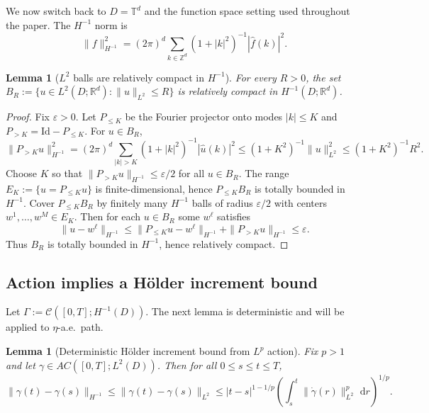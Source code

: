 \documentclass{article}
\numberwithin{equation}{section}
\theoremstyle{plain}
\newtheorem{lemma}[theorem]{Lemma}
\theoremstyle{definition}
\theoremstyle{remark}
\newcommand{\R}{\mathbb{R}}
\newcommand{\T}{\mathbb{T}}
\newcommand{\Ccal}{\mathcal{C}}
\newcommand{\Id}{\mathrm{Id}}
\newcommand{\dd}{\,\mathrm{d}}
\newcommand{\Z}{\mathbb{Z}}
\begin{document}
We now switch back to $D=\T^d$ and the function space setting used throughout the paper.
The $H^{-1}$ norm is
\[
\|f\|_{H^{-1}}^2=(2\pi)^d\sum_{k\in\Z^d}(1+|k|^2)^{-1}|\widehat f(k)|^2.
\]

\begin{lemma}[$L^2$ balls are relatively compact in $H^{-1}$]
\label{lem:L2ball-compact-Hminus1}
For every $R>0$, the set $B_R:=\{u\in L^2(D;\R^d):\|u\|_{L^2}\le R\}$ is relatively compact in $H^{-1}(D;\R^d)$.
\end{lemma}

\begin{proof}
Fix $\varepsilon>0$. Let $P_{\le K}$ be the Fourier projector onto modes $|k|\le K$ and $P_{>K}=\Id-P_{\le K}$.
For $u\in B_R$,
\[
\|P_{>K}u\|_{H^{-1}}^2
=(2\pi)^d\sum_{|k|>K}(1+|k|^2)^{-1}|\widehat u(k)|^2
\le (1+K^2)^{-1}\|u\|_{L^2}^2
\le (1+K^2)^{-1}R^2.
\]
Choose $K$ so that $\|P_{>K}u\|_{H^{-1}}\le \varepsilon/2$ for all $u\in B_R$.
The range $E_K:=\{u=P_{\le K}u\}$ is finite-dimensional, hence $P_{\le K}B_R$ is totally bounded in $H^{-1}$.
Cover $P_{\le K}B_R$ by finitely many $H^{-1}$ balls of radius $\varepsilon/2$ with centers $w^1,\dots,w^M\in E_K$.
Then for each $u\in B_R$ some $w^\ell$ satisfies
\[
\|u-w^\ell\|_{H^{-1}}\le \|P_{\le K}u-w^\ell\|_{H^{-1}}+\|P_{>K}u\|_{H^{-1}}\le \varepsilon.
\]
Thus $B_R$ is totally bounded in $H^{-1}$, hence relatively compact.
\end{proof}

\subsection{Action implies a H\"older increment bound}

Let $\Gamma:=\Ccal([0,T];H^{-1}(D))$. The next lemma is deterministic and will be applied to $\eta$-a.e.\ path.

\begin{lemma}[Deterministic H\"older increment bound from $L^p$ action]\label{lem:det-holder-from-action}
Fix $p>1$ and let $\gamma\in AC([0,T];L^2(D))$. Then for all $0\le s\le t\le T$,
\begin{equation}\label{eq:det-holder-Hminus1}
\|\gamma(t)-\gamma(s)\|_{H^{-1}}
\le \|\gamma(t)-\gamma(s)\|_{L^2}
\le |t-s|^{1-1/p}\left(\int_s^t \|\dot\gamma(r)\|_{L^2}^p\,\dd r\right)^{1/p}.
\end{equation}
\end{lemma}
\end{document}
